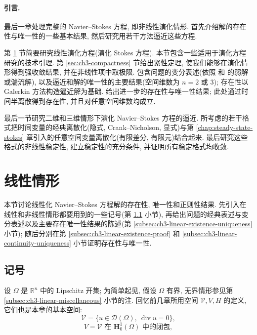 \hypertarget{chapter-03-page-182}{}
\paragraph{引言.}
最后一章处理完整的 Navier--Stokes 方程, 即非线性演化情形. 首先介绍解的存在性与唯一性的一些基本结果, 然后研究用若干方法逼近这些方程.

第 \ref{sec:ch3-linear-case} 节简要研究线性演化方程(演化 Stokes 方程). 本节包含一些适用于演化方程研究的技术引理. 第 \ref{sec:ch3-compactness} 节给出紧性定理, 使我们能够在演化情形得到强收敛结果, 并在非线性项中取极限.  包含问题的变分表述(依照  和  的弱解或湍流解), 以及逼近和解的唯一性的主要结果(空间维数为 $n=2$ 或 $3$); 存在性以 Galerkin 方法构造逼近解为基础.  给出进一步的存在性与唯一性结果; 此处通过时间半离散得到存在性, 并且对任意空间维数均成立.

最后一节研究二维和三维情形下演化 Navier--Stokes 方程的逼近. 所考虑的若干格式把时间变量的经典离散化(隐式, Crank--Nicholson, 显式)与第 \ref{chap:steady-state-stokes} 章引入的任意空间变量离散化(有限差分, 有限元)结合起来. 最后研究这些格式的非线性稳定性, 建立稳定性的充分条件, 并证明所有稳定格式均收敛.

\section{线性情形}
\label{sec:ch3-linear-case}
本节讨论线性化 Navier--Stokes 方程解的存在性, 唯一性和正则性结果. 先引入在线性和非线性情形都要用到的一些记号(第 \ref{subsec:ch3-linear-notation} 小节), 再给出问题的经典表述与变分表述以及主要存在唯一性结果的陈述(第 \ref{subsec:ch3-linear-existence-uniqueness} 小节); 随后分别在第 \ref{subsec:ch3-linear-existence-proof} 和 \ref{subsec:ch3-linear-continuity-uniqueness} 小节证明存在性与唯一性.

\subsection{记号}
\label{subsec:ch3-linear-notation}
设 $\Omega$ 是 $\mathbb R^n$ 中的 Lipschitz 开集; 为简单起见, 假设 $\Omega$ 有界, 无界情形参见第 \ref{subsec:ch3-linear-miscellaneous} 小节的注. 回忆前几章所用空间 $\mathcal V,V,H$ 的定义, 它们也是本章的基本空间:
\begin{equation}
\mathcal V=\{u\in\mathcal D(\Omega),\ \operatorname{div}u=0\},
\label{eq:ch3-linear-test-space}
\end{equation}
\begin{equation}
V=\mathcal V\text{ 在 }\mathbf H_0^1(\Omega)\text{ 中的闭包},
\label{eq:ch3-linear-v-space}
\end{equation}

